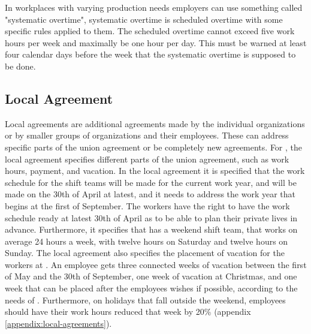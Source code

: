 In workplaces with varying production needs employers can use something called "systematic overtime", systematic overtime is scheduled overtime with some specific rules applied to them. The scheduled overtime cannot exceed five work hours per week and maximally be one hour per day. This must be warned at least four calendar days before the week that the systematic overtime is supposed to be done. \parencite{industriens_overenskomst}

\subsection{Local Agreement}
Local agreements are additional agreements made by the individual organizations or by smaller groups of organizations and their employees. These can address specific parts of the union agreement or be completely new agreements. For \siemens, the local agreement specifies different parts of the union agreement, such as work hours, payment, and vacation. 
In the local agreement it is specified that the work schedule for the shift teams will be made for the current work year, and will be made on the 30th of April at latest, and it needs to address the work year that begins at the first of September. The workers have the right to have the work schedule ready at latest 30th of April as to be able to plan their private lives in advance.
Furthermore, it specifies that \siemens has a weekend shift team, that works on average 24 hours a week, with twelve hours on Saturday and twelve hours on Sunday.
The local agreement also specifies the placement of vacation for the workers at \siemens. An employee gets three connected weeks of vacation between the first of May and the 30th of September, one week of vacation at Christmas, and one week that can be placed after the employees wishes if possible, according to the needs of \siemens. Furthermore, on holidays that fall outside the weekend, employees should have their work hours reduced that week by 20\% (appendix \ref{appendix:local-agreements}).
